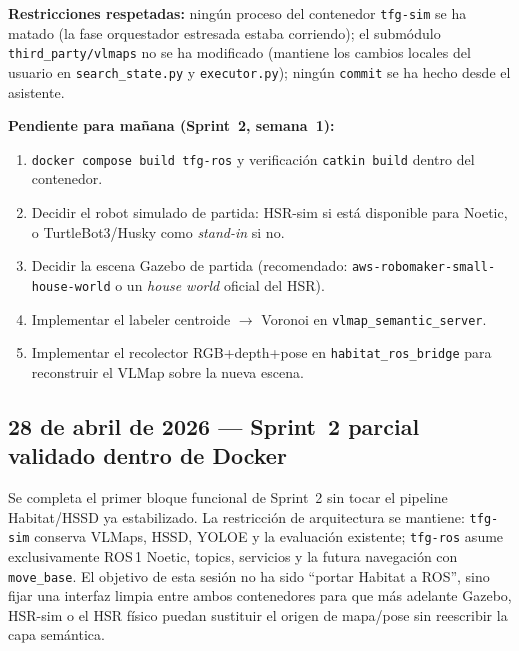 \documentclass[11pt,a4paper]{article}
\begin{document}
\textbf{Restricciones respetadas:} ningún proceso del contenedor
\texttt{tfg-sim} se ha matado (la fase orquestador estresada estaba
corriendo); el submódulo \texttt{third\_party/vlmaps} no se ha
modificado (mantiene los cambios locales del usuario en
\texttt{search\_state.py} y \texttt{executor.py}); ningún
\texttt{commit} se ha hecho desde el asistente.

\textbf{Pendiente para mañana (Sprint~2, semana~1):}
\begin{enumerate}
  \item \texttt{docker compose build tfg-ros} y verificación
        \texttt{catkin build} dentro del contenedor.
  \item Decidir el robot simulado de partida: HSR-sim si está
        disponible para Noetic, o TurtleBot3/Husky como \emph{stand-in}
        si no.
  \item Decidir la escena Gazebo de partida (recomendado:
        \texttt{aws-robomaker-small-house-world} o un \emph{house
        world} oficial del HSR).
  \item Implementar el labeler centroide $\rightarrow$ Voronoi en
        \texttt{vlmap\_semantic\_server}.
  \item Implementar el recolector RGB+depth+pose en
        \texttt{habitat\_ros\_bridge} para reconstruir el VLMap sobre
        la nueva escena.
\end{enumerate}

\subsection*{28 de abril de 2026 --- Sprint~2 parcial validado dentro de Docker}

Se completa el primer bloque funcional de Sprint~2 sin tocar el pipeline
Habitat/HSSD ya estabilizado. La restricción de arquitectura se mantiene:
\texttt{tfg-sim} conserva VLMaps, HSSD, YOLOE y la evaluación existente;
\texttt{tfg-ros} asume exclusivamente ROS\,1 Noetic, topics, servicios y
la futura navegación con \texttt{move\_base}. El objetivo de esta sesión no
ha sido ``portar Habitat a ROS'', sino fijar una interfaz limpia entre ambos
contenedores para que más adelante Gazebo, HSR-sim o el HSR físico puedan
sustituir el origen de mapa/pose sin reescribir la capa semántica.
\end{document}
